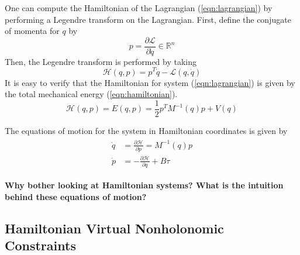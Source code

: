 One can compute the Hamiltonian of the Lagrangian (\ref{eqn:lagrangian}) by 
performing a Legendre transform on the Lagrangian. 
First, define the conjugate of momenta for \(q\) by 
\begin{equation*}
p = \frac{\partial \mathcal{L}}{\partial \dot{q}} \in \mathbb{R}^n
\end{equation*}
Then, the Legendre transform is performed by taking
\begin{equation*}
\mathcal{H}(q,p) = p^T \dot{q} - \mathcal{L}(q,\dot{q})
\end{equation*}
It is easy to verify that the Hamiltonian for system (\ref{eqn:lagrangian}) is 
given by the total mechanical energy (\ref{eqn:hamiltonian}).
\begin{equation}\label{eqn:hamiltonian}
\mathcal{H}(q,p) = E(q,p) = \frac{1}{2} p^T M^{-1}(q) p + V(q)
\end{equation}

The equations of motion for the system in Hamiltonian coordinates is given by
\begin{align}\label{eqn:hamiltionian_eom}
\begin{split}
\dot{q} &= \frac{\partial \mathcal{H}}{\partial p} = M^{-1}(q) p \\
\dot{p} &= -\frac{\partial \mathcal{H}}{\partial q} + B \tau
\end{split}
\end{align}

\textbf{Why bother looking at Hamiltonian systems? What is the intuition behind
these equations of motion?}

\subsection{Hamiltonian Virtual Nonholonomic Constraints}


